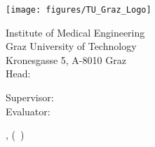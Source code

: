 

\thispagestyle{empty}  %
\large  %

\begin{center}

\myauthor

\vfill

{\LARGE\bfseries\mytitle}

\vfill

{\bfseries\myworktitle}

\vfill

\texttt{[image: figures/TU\_Graz\_Logo]}

\vspace*{1cm}

Institute of Medical Engineering\\
Graz University of Technology\\
Kronesgasse 5, A-8010 Graz\\
Head: \myinstitutehead\\

\vfill

Supervisor: \mysupervisor\\
Evaluator: \myevaluator

\vfill

\mysubmissiontown, (\mysubmissionmonth~\mysubmissionyear)

\end{center}
\normalsize %
